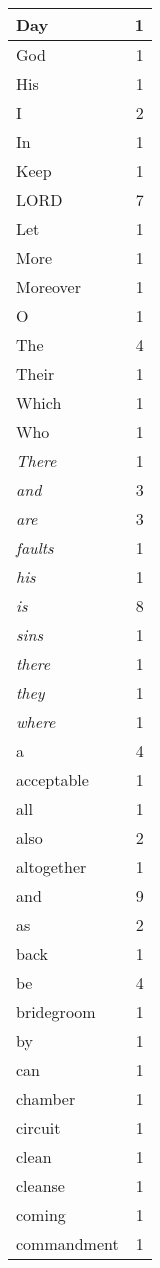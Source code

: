 \begin{center}
\begin{longtable}{l|r}
\hline \hline
\endlastfoot
Day & 1 \\ \hline
God & 1 \\ \hline
His & 1 \\ \hline
I & 2 \\ \hline
In & 1 \\ \hline
Keep & 1 \\ \hline
LORD & 7 \\ \hline
Let & 1 \\ \hline
More & 1 \\ \hline
Moreover & 1 \\ \hline
O & 1 \\ \hline
The & 4 \\ \hline
Their & 1 \\ \hline
Which & 1 \\ \hline
Who & 1 \\ \hline
\emph{There} & 1 \\ \hline
\emph{and} & 3 \\ \hline
\emph{are} & 3 \\ \hline
\emph{faults} & 1 \\ \hline
\emph{his} & 1 \\ \hline
\emph{is} & 8 \\ \hline
\emph{sins} & 1 \\ \hline
\emph{there} & 1 \\ \hline
\emph{they} & 1 \\ \hline
\emph{where} & 1 \\ \hline
a & 4 \\ \hline
acceptable & 1 \\ \hline
all & 1 \\ \hline
also & 2 \\ \hline
altogether & 1 \\ \hline
and & 9 \\ \hline
as & 2 \\ \hline
back & 1 \\ \hline
be & 4 \\ \hline
bridegroom & 1 \\ \hline
by & 1 \\ \hline
can & 1 \\ \hline
chamber & 1 \\ \hline
circuit & 1 \\ \hline
clean & 1 \\ \hline
cleanse & 1 \\ \hline
coming & 1 \\ \hline
commandment & 1 \\ \hline

\end{longtable}
\end{center}

